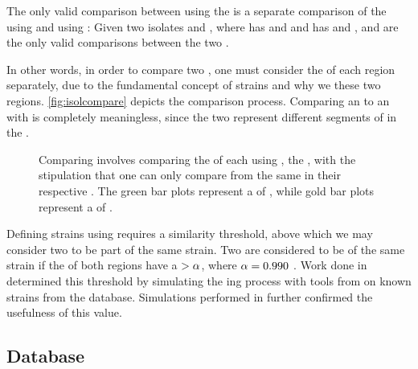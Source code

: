 \begin{principle}
The only valid comparison between \isols{} using the \pearson{} \pcfunclabel{} is a separate comparison of the \Ssixt{} \pyros{} using \pcfunclabel{} and \Sfive{} \pyros{} using \pcfunclabel{}:
Given two isolates \isola{} and \isolb{}, where 
\isola{} has \pyros{} \isolasixt{} and \isolafive{}
and
\isolb{} has \pyros{} \isolbsixt{} and \isolbfive{},
\pcisolsixt{}
and
\pcisolfive{}
are the only valid comparisons between the two \isols{}.
\end{principle}
\index{\pearson{}}
\index{\pcfunclabel{}}

\noindent 
In other words, in order to compare two \isols{}, one must consider the \pyros{} of each \itsshort{} region separately, due to the fundamental concept of strains and why we \pyro{} these two regions.
\autoref{fig:isolcompare} depicts the comparison process.
Comparing an \Ssixt{} \pyro{} to an \Sfive{} \pyro{} with \pcfunclabel{} is completely meaningless, since the two \pyros{} represent different segments of \dna{} in the \ecoli{}.

\begin{figure}
    \centering
    
    
    
    \caption{Comparing \isols{} involves comparing the \pyros{} of each \isol{} using \pcfunclabel{}, the \pearson{}, with the stipulation that one can only compare \pyros{} from the same \itsshort{} in their respective \isol{}. The green bar plots represent a \pyro{} of \Ssixt{}, while gold bar plots represent a \pyro{} of \Sfive{}.}
    \label{fig:isolcompare}
\end{figure}

Defining strains using \pearson{} requires a similarity threshold, above which we may consider two \isols{} to be part of the same strain.
Two \isols{} are considered to be of the same strain if the \pyros{} of both regions have a $  > \alpha{}$, where $\alpha{} = 0.990$ \cite{Shealy:SeniorProject, Black2014121}.
\index{\a{}}
Work done in \cite{Shealy:SeniorProject} determined this \a{} threshold by simulating the \pyro{}ing process with tools from \cite{montana2013algorithms} on known \ecoli{} strains from the \ncbilong{} database.
Simulations performed in \cite{DBLP:conf/bibm/BrandtMSBGK12} further confirmed the usefulness of this \a{} value.

\subsection{Database}